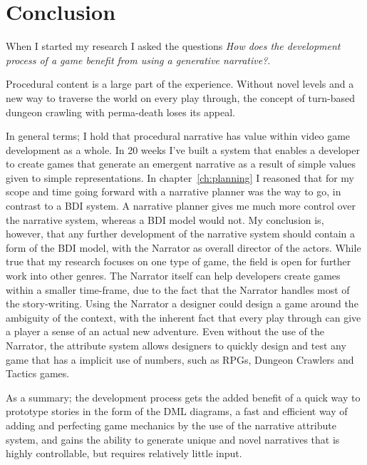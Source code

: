 \chapter*{Conclusion}
When I started my research I asked the questions \textit{How does the development process of a \rogue game benefit from using a generative narrative?}.

Procedural content is a large part of the \rogue experience. 
Without novel levels and a new way to traverse the world on every play through, the concept of turn-based dungeon crawling with perma-death loses its appeal.

In general terms; I hold that procedural narrative has value within video game development as a whole.
In 20 weeks I've built a system that enables a developer to create games that generate an emergent narrative as a result of simple values given to simple representations.
In chapter~\ref{ch:planning} I reasoned that for my scope and time going forward with a narrative planner was the way to go, in contrast to a BDI system.
A narrative planner gives me much more control over the narrative system, whereas a BDI model would not. 
My conclusion is, however, that any further development of the narrative system should contain a form of the BDI model, with the Narrator as overall director of the actors. 
While true that my research focuses on one type of game, the field is open for further work into other genres.
The Narrator itself can help developers create \rogue games within a smaller time-frame, due to the fact that the Narrator handles most of the story-writing.
Using the Narrator a designer could design a game around the ambiguity of the context, with the inherent fact that every play through can give a player a sense of an actual new adventure.
Even without the use of the Narrator, the attribute system allows designers to quickly design and test any game that has a implicit use of numbers, such as RPGs, Dungeon Crawlers and Tactics games.

As a summary; the development process gets the added benefit of a quick way to prototype stories in the form of the DML diagrams, a fast and efficient way of adding and perfecting game mechanics by the use of the narrative attribute system, and gains the ability to generate unique and novel narratives that is highly controllable, but requires relatively little input.